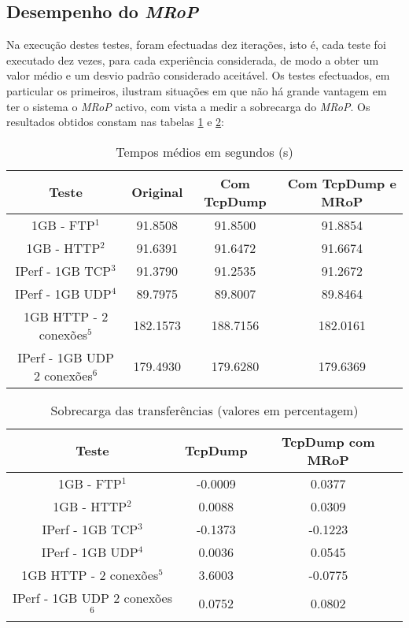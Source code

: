 \subsection{Desempenho do \textit{MRoP}}


Na execução destes testes, foram efectuadas dez iterações, isto é, cada teste foi executado dez vezes, para cada experiência considerada, de modo a obter um valor médio e um desvio padrão considerado aceitável.
Os testes efectuados, em particular os primeiros, ilustram situações em que não há grande vantagem em ter o sistema o \textit{MRoP} activo, com vista a medir a sobrecarga do \textit{MRoP}.
Os resultados obtidos constam nas tabelas \ref{tab:desempenho} e \ref{tab:overhead}:

\begin{table}[!htb]
\begin{center}
\caption{Tempos médios em segundos (s)}
\begin{tabular}{ | c | c | c | c |  }
\hline
Teste & \hspace {0.3cm} Original \hspace {0.3cm}& \hspace {0.2cm} Com TcpDump \hspace {0.2cm} & Com TcpDump e MRoP \\
\hline
1GB - FTP$^{1}$ & 91.8508	& 91.8500 & 91.8854 \\
1GB - HTTP$^{2}$ & 91.6391 & 91.6472 & 91.6674 \\ 
IPerf - 1GB TCP$^{3}$ & 91.3790	& 91.2535	& 91.2672 \\
IPerf - 1GB UDP$^{4}$ & 89.7975 & 89.8007 & 89.8464 \\
\hline
\hline
1GB HTTP - 2 conexões$^{5}$ & 182.1573 & 188.7156 & 182.0161 \\
IPerf - 1GB UDP 2 conexões$^{6}$ & 179.4930 & 179.6280 & 179.6369 \\
\hline
\end{tabular}
\label{tab:desempenho}
\end{center}
\end{table}

\begin{table}[!htb]
\begin{center}
\caption{Sobrecarga das transferências (valores em percentagem)}
\begin{tabular}{ | c | c | c |}
\hline
Teste & \hspace {0.3cm} TcpDump \hspace {0.3cm} & TcpDump com MRoP  \\

\hline
1GB - FTP$^{1}$ & -0.0009  & 0.0377  \\
1GB - HTTP$^{2}$ & 0.0088 &  0.0309   \\
IPerf - 1GB TCP$^{3}$ & -0.1373 &  -0.1223   \\
IPerf - 1GB UDP$^{4}$ & 0.0036 & 0.0545 \\
\hline
\hline
1GB HTTP - 2 conexões$^{5}$ & 3.6003 & -0.0775   \\
IPerf - 1GB UDP 2 conexões$^{6}$ & 0.0752 & 0.0802   \\
\hline
\end{tabular}
\label{tab:overhead}
\end{center}
\end{table}


